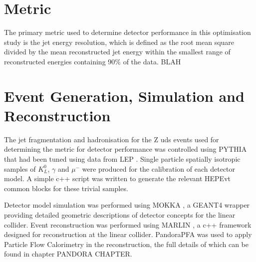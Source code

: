 
\section{Metric}

The primary metric used to determine detector performance in this optimisation study is the jet energy resolution, which is defined as the root mean square divided by the mean reconstructed jet energy within the smallest range of reconstructed energies containing 90\% of the data.  BLAH



\section{Event Generation, Simulation and Reconstruction}

The jet fragmentation and hadronisation for the Z \rightarrow uds events used for determining the metric for detector performance was controlled using PYTHIA \cite{Sjostrand:2006za} that had been tuned using data from LEP \cite{Alexander:1995bk}.  Single particle spatially isotropic samples of $K_{L}^{0}$, $\gamma$ and $\mu^{-}$ were produced for the calibration of each detector model.  A simple c++ script was written to generate the relevant HEPEvt common blocks for these trivial samples. 

Detector model simulation was performed using MOKKA \cite{MoradeFreitas:2002kj}, a GEANT4 \cite{Agostinelli:2002hh} wrapper providing detailed geometric descriptions of detector concepts for the linear collider.  Event reconstruction was performed using MARLIN \cite{Gaede:2006pj}, a c++ framework designed for reconstruction at the linear collider.  PandoraPFA \cite{arXiv:0907.3577, arXiv:1209.4039} was used to apply Particle Flow Calorimetry in the reconstruction, the full details of which can be found in chapter PANDORA CHAPTER.




